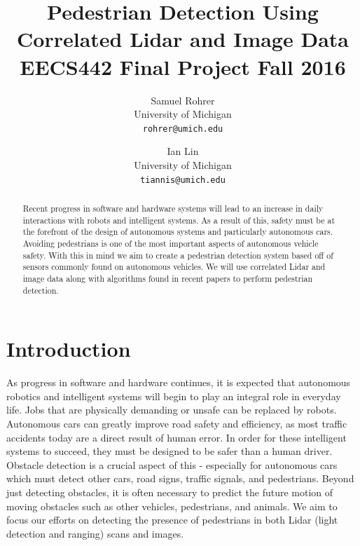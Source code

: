 \documentclass[10pt,twocolumn,letterpaper]{article}
\begin{document}
\title{Pedestrian Detection Using Correlated Lidar and Image Data \\
      EECS442 Final Project Fall 2016 }

\author{Samuel Rohrer\\
University of Michigan\\
{\tt\small rohrer@umich.edu}
\and
Ian Lin\\
University of Michigan\\
{\tt\small tiannis@umich.edu}
}

\maketitle

\begin{abstract}
  Recent progress in software and hardware systems will lead to an increase in
  daily interactions with robots and intelligent systems. As a result of this,
  safety must be at the forefront of the design of autonomous systems and
  particularly autonomous cars. Avoiding pedestrians is one of the most important
  aspects of autonomous vehicle safety. With this in mind we aim to create a pedestrian
  detection system based off of sensors commonly found on autonomous vehicles.
  We will use correlated Lidar and image data along with algorithms found in
  recent papers to perform pedestrian detection.

\end{abstract}

\section{Introduction}

  As progress in software and hardware continues, it is expected that
  autonomous robotics and intelligent systems will begin to play an integral
  role in everyday life. Jobs that are physically demanding or unsafe can be
  replaced by robots. Autonomous cars can greatly improve road safety and
  efficiency, as most traffic accidents today are a direct result of human error.
  In order for these intelligent systems to succeed, they must be designed
  to be safer than a human driver. Obstacle detection is a crucial aspect
  of this - especially for autonomous cars which
  must detect other cars, road signs, traffic signals, and
  pedestrians. Beyond just detecting obstacles, it is often necessary
  to predict the future motion of moving obstacles such as other vehicles,
  pedestrians, and animals. We aim to focus our efforts on detecting the presence
  of pedestrians in both Lidar (light
  detection and ranging) scans and images.
\end{document}
